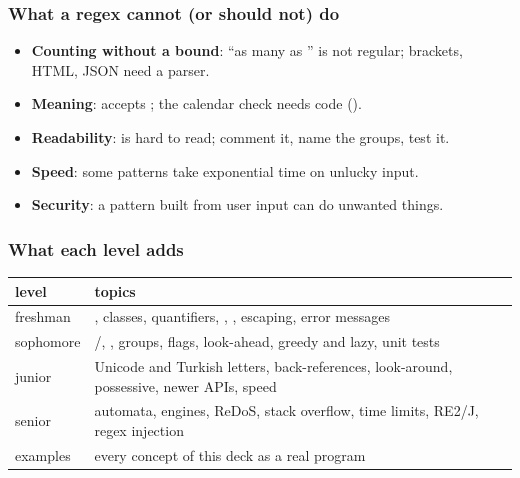 \documentclass[aspectratio=169,10pt,compress]{beamer}
\begin{document}
\begin{frame}[t,fragile] \frametitle{What a regex cannot (or should not) do}
  \begin{itemize}\small
    \item \textbf{Counting without a bound}: ``as many \hCode{(} as \hCode{)}'' is not regular; brackets, HTML, JSON need a parser.
    \item \textbf{Meaning}:  accepts ; the calendar check needs code ().
    \item \textbf{Readability}:  is hard to read; comment it, name the groups, test it.
    \item \textbf{Speed}: some patterns take exponential time on unlucky input.
    \item \textbf{Security}: a pattern built from user input can do unwanted things.
  \end{itemize}
  \vspace{0.5em}
\end{frame}





\begin{frame}[t,fragile] \frametitle{What each level adds}
  \begin{center}\small
  \begin{tabular}{@{}lL{0.7\textwidth}@{}}
    \toprule
    \textbf{level}  & \textbf{topics} \\
    \midrule
    freshman        & , classes, quantifiers, , , escaping, error messages \\
    sophomore       & /, , groups, flags, look-ahead, greedy and lazy, unit tests \\
    junior          & Unicode and Turkish letters, back-references, look-around, possessive, newer APIs, speed \\
    senior          & automata, engines, ReDoS, stack overflow, time limits, RE2/J, regex injection \\
    examples        & every concept of this deck as a real program \\
    \bottomrule
  \end{tabular}
  \end{center}
\end{frame}
\end{document}

